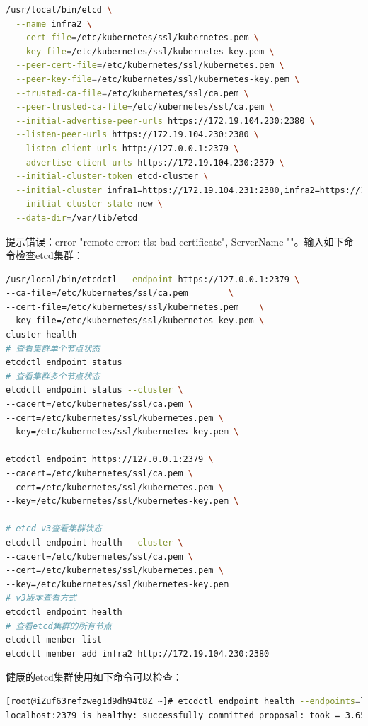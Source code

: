 \documentclass[8pt]{book}
\numberwithin{dummy}{section}
\theoremstyle{ocrenumbox}
\theoremstyle{blacknumex}
\theoremstyle{blacknumbox}
\theoremstyle{ocrenum}
\begin{document}
\begin{lstlisting}[language=Bash]
/usr/local/bin/etcd \
  --name infra2 \
  --cert-file=/etc/kubernetes/ssl/kubernetes.pem \
  --key-file=/etc/kubernetes/ssl/kubernetes-key.pem \
  --peer-cert-file=/etc/kubernetes/ssl/kubernetes.pem \
  --peer-key-file=/etc/kubernetes/ssl/kubernetes-key.pem \
  --trusted-ca-file=/etc/kubernetes/ssl/ca.pem \
  --peer-trusted-ca-file=/etc/kubernetes/ssl/ca.pem \
  --initial-advertise-peer-urls https://172.19.104.230:2380 \
  --listen-peer-urls https://172.19.104.230:2380 \
  --listen-client-urls http://127.0.0.1:2379 \
  --advertise-client-urls https://172.19.104.230:2379 \
  --initial-cluster-token etcd-cluster \
  --initial-cluster infra1=https://172.19.104.231:2380,infra2=https://172.19.104.230:2380,infra3=https://172.19.150.82:2380 \
  --initial-cluster-state new \
  --data-dir=/var/lib/etcd
\end{lstlisting}

提示错误：error "remote error: tls: bad certificate", ServerName ""。输入如下命令检查etcd集群：

\begin{lstlisting}[language=Bash]
/usr/local/bin/etcdctl --endpoint https://127.0.0.1:2379 \
--ca-file=/etc/kubernetes/ssl/ca.pem        \
--cert-file=/etc/kubernetes/ssl/kubernetes.pem    \
--key-file=/etc/kubernetes/ssl/kubernetes-key.pem \
cluster-health
# 查看集群单个节点状态
etcdctl endpoint status
# 查看集群多个节点状态
etcdctl endpoint status --cluster \
--cacert=/etc/kubernetes/ssl/ca.pem \
--cert=/etc/kubernetes/ssl/kubernetes.pem \
--key=/etc/kubernetes/ssl/kubernetes-key.pem \

etcdctl endpoint https://127.0.0.1:2379 \
--cacert=/etc/kubernetes/ssl/ca.pem \
--cert=/etc/kubernetes/ssl/kubernetes.pem \
--key=/etc/kubernetes/ssl/kubernetes-key.pem \

# etcd v3查看集群状态
etcdctl endpoint health --cluster \
--cacert=/etc/kubernetes/ssl/ca.pem \
--cert=/etc/kubernetes/ssl/kubernetes.pem \
--key=/etc/kubernetes/ssl/kubernetes-key.pem
# v3版本查看方式
etcdctl endpoint health
# 查看etcd集群的所有节点
etcdctl member list
etcdctl member add infra2 http://172.19.104.230:2380
\end{lstlisting}

健康的etcd集群使用如下命令可以检查：

\begin{lstlisting}[language=Bash]
[root@iZuf63refzweg1d9dh94t8Z ~]# etcdctl endpoint health --endpoints=localhost:2379
localhost:2379 is healthy: successfully committed proposal: took = 3.656346ms
\end{lstlisting}
\end{document}
